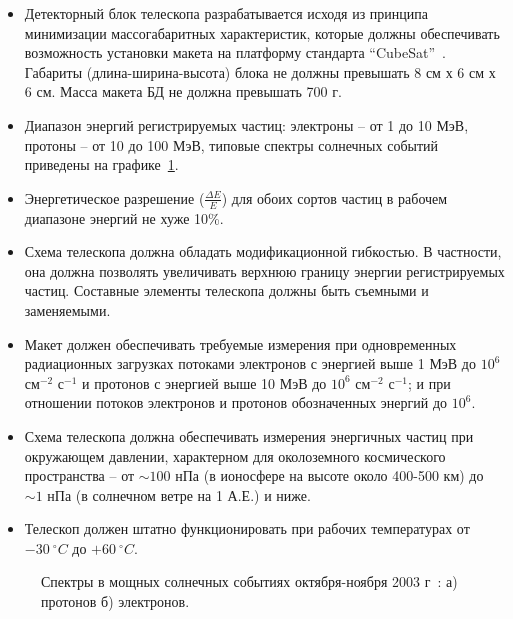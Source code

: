 \begin{itemize}
    \item Детекторный блок телескопа разрабатывается исходя из принципа минимизации массогабаритных характеристик, которые должны обеспечивать возможность установки макета на платформу стандарта “CubeSat”~\cite{cubesat}. Габариты (длина-ширина-высота) блока не должны превышать 8 см х 6 см х 6 см. Масса макета БД не должна превышать 700 г.
    \item Диапазон энергий регистрируемых частиц: электроны -- от 1 до 10 МэВ, протоны -- от 10 до 100 МэВ, типовые спектры солнечных событий приведены на графике~\ref{sat:spectrum}.
    \item Энергетическое разрешение ($\frac{\Delta E}{E}$) для обоих сортов частиц в рабочем диапазоне энергий не хуже 10\%.
    \item Схема телескопа должна обладать модификационной гибкостью. В частности, она должна позволять увеличивать верхнюю границу энергии регистрируемых частиц. Составные элементы телескопа должны быть съемными и заменяемыми.
    \item Макет должен обеспечивать требуемые измерения при одновременных радиационных загрузках потоками электронов с энергией выше 1 МэВ до $10^6$ см$^{-2}$ с$^{-1}$ и протонов с энергией выше 10 МэВ до $10^6$ см$^{-2}$ с$^{-1}$; и при отношении потоков электронов и протонов обозначенных энергий до $10^6$.
    \item Схема телескопа должна обеспечивать измерения энергичных частиц при окружающем давлении, характерном для околоземного космического пространства – от $\sim 100$ нПа (в ионосфере на высоте около 400-500 км) до $\sim 1$ нПа (в солнечном ветре на 1 А.Е.) и ниже. 
    \item Телескоп должен штатно функционировать при рабочих температурах от $-30~^{\circ}C$ до $+60~^{\circ}C$.
    
\end{itemize}

\begin{figure}[t]
    \begin{center}
        \begin{minipage}[h]{0.49\linewidth}
        \end{minipage}
        \hfill
        \begin{minipage}[h]{0.49\linewidth}
        \end{minipage}
        \caption{ Спектры в мощных солнечных событиях октября-ноября 2003 г~\cite{mewaldt2005proton}: а) протонов б) электронов.}
    \end{center}
    \label{sat:spectrum}
\end{figure}

